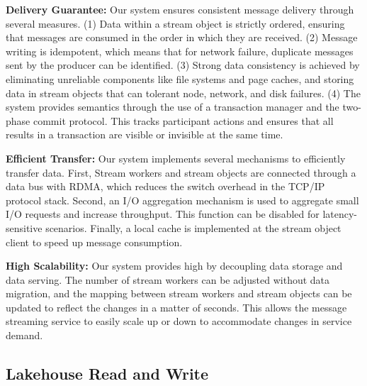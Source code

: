 \noindent\textbf{Delivery Guarantee:} Our system ensures consistent message delivery through several measures. (1) Data within a stream object is strictly ordered, ensuring that messages are consumed in the order in which they are received. (2) Message writing is idempotent, which means that for network failure, duplicate messages sent by the producer  can be identified.
 (3) Strong data consistency is achieved by eliminating unreliable components like file systems and page caches, and storing data in  stream objects that can tolerant node, network, and disk failures. (4) The system provides  semantics through the use of a transaction manager and the two-phase commit protocol. This tracks participant actions and ensures that all results in a transaction are visible or invisible at the same time.
 

\noindent\textbf{Efficient Transfer:} Our system implements several mechanisms to efficiently transfer data. First, Stream workers and stream objects are connected through a data bus with RDMA, which reduces the switch overhead in the TCP/IP protocol stack. Second, an I/O aggregation mechanism is used to aggregate small I/O requests and increase throughput. This function can be disabled for latency-sensitive scenarios. Finally, a local cache is implemented at the stream object client to speed up message consumption.

\noindent\textbf{High Scalability:} Our system provides high  by decoupling data storage and data serving. The number of stream workers can be adjusted without data migration, and the mapping between stream workers and stream objects can be updated to reflect the changes in a matter of seconds. This allows the message streaming service to easily scale up or down to accommodate changes in service demand.



\subsection{Lakehouse Read and Write}~\label{subsec:lakehouse}

